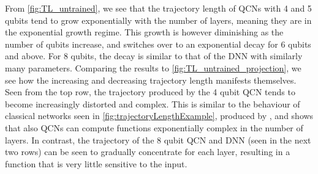 
From \autoref{fig:TL_untrained}, we see that the trajectory length of QCNs with 4 and 5 qubits tend to grow exponentially with the number of layers, meaning they are in the exponential growth regime. This growth is however diminishing as the number of qubits increase, and switches over to an exponential decay for 6 qubits and above. For 8 qubits, the decay is similar to that of the DNN with similarly many parameters. Comparing the results to \autoref{fig:TL_untrained_projection}, we see how the increasing and decreasing trajectory length manifests themselves. Seen from the top row, the trajectory produced by the 4 qubit QCN tends to become increasingly distorted and complex. This is similar to the behaviour of classical networks seen in \autoref{fig:trajectoryLengthExample}, produced by \citet{raghu2017expressive}, and shows that also QCNs can compute functions exponentially complex in the number of layers. In contrast, the trajectory of the 8 qubit QCN and DNN (seen in the next two rows) can be seen to gradually concentrate for each layer, resulting in a function that is very little sensitive to the input.  


